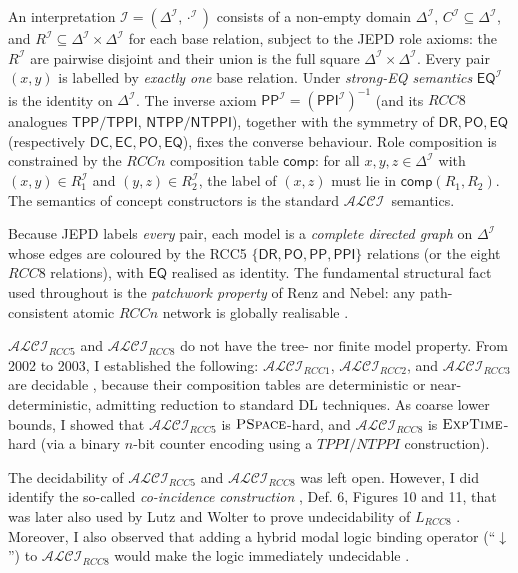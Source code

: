 \documentclass[
]{ceurart}
\theoremstyle{definition}
\newcommand{\ALCI}{\ensuremath{\mathcal{ALCI}}}
\newcommand{\ALCIRCC}[1]{\ensuremath{\mathcal{ALCI}_{\mathit{RCC#1}}}}
\newcommand{\LRCC}[1]{\ensuremath{L_{\mathit{RCC#1}}}}
\newcommand{\DR}{\ensuremath{\mathsf{DR}}}
\newcommand{\PO}{\ensuremath{\mathsf{PO}}}
\newcommand{\EQ}{\ensuremath{\mathsf{EQ}}}
\newcommand{\PP}{\ensuremath{\mathsf{PP}}}
\newcommand{\PPI}{\ensuremath{\mathsf{PPI}}}
\newcommand{\TPP}{\ensuremath{\mathsf{TPP}}}
\newcommand{\NTPP}{\ensuremath{\mathsf{NTPP}}}
\newcommand{\TPPI}{\ensuremath{\mathsf{TPPI}}}
\newcommand{\NTPPI}{\ensuremath{\mathsf{NTPPI}}}
\newcommand{\DC}{\ensuremath{\mathsf{DC}}}
\newcommand{\EC}{\ensuremath{\mathsf{EC}}}
\newcommand{\comp}{\ensuremath{\mathsf{comp}}}
\newcommand{\EXPTIME}{\textsc{ExpTime}}
\newcommand{\PSPACE}{\textsc{PSpace}}
\newcommand{\RCCfive}{\{\DR,\PO,\PP,\PPI\}}
\begin{document}
An interpretation $\mathcal{I} = (\Delta^{\mathcal{I}},
\cdot^{\mathcal{I}})$ consists of a non-empty domain
$\Delta^{\mathcal{I}}$, $C^{\mathcal{I}} \subseteq
\Delta^{\mathcal{I}}$, and $R^{\mathcal{I}} \subseteq
\Delta^{\mathcal{I}} \times \Delta^{\mathcal{I}}$ for each base
relation, subject to the JEPD role axioms: the $R^{\mathcal{I}}$ are
pairwise disjoint and their union is the full square
$\Delta^{\mathcal{I}} \times \Delta^{\mathcal{I}}$. Every pair $(x,y)$
is labelled by \emph{exactly one} base relation. Under \emph{strong-EQ
semantics} \cite{Wessel2003} $\EQ^{\mathcal{I}}$ is the identity on
$\Delta^{\mathcal{I}}$. The inverse axiom $\PP^{\mathcal{I}} =
(\PPI^{\mathcal{I}})^{-1}$ (and its $\mathit{RCC}8$ analogues
$\TPP/\TPPI$, $\NTPP/\NTPPI$), together with the symmetry of
$\DR,\PO,\EQ$ (respectively $\DC,\EC,\PO,\EQ$), fixes the converse
behaviour. Role composition is constrained by the $\mathit{RCC}n$
composition table $\comp$: for all $x,y,z \in \Delta^{\mathcal{I}}$
with $(x,y) \in R_1^{\mathcal{I}}$ and $(y,z) \in R_2^{\mathcal{I}}$,
the label of $(x,z)$ must lie in $\comp(R_1, R_2)$. The semantics of
concept constructors is the standard \ALCI\ semantics. 

Because JEPD labels \emph{every} pair, each model is a \emph{complete
directed graph} on $\Delta^{\mathcal{I}}$ whose edges are coloured by
the RCC5 $\RCCfive$ relations (or the eight $\mathit{RCC}8$
relations), with $\EQ$ realised as identity. The fundamental
structural fact used throughout is the \emph{patchwork property} of
Renz and Nebel: any path-consistent atomic $\mathit{RCC}n$ network is
globally realisable \cite{RenzNebel1999}. 

$\ALCIRCC{5}$ and $\ALCIRCC{8}$ do not have the tree- nor finite model
property. From 2002 to 2003, I established the following:
$\ALCIRCC{1}$, $\ALCIRCC{2}$, and $\ALCIRCC{3}$ are decidable
\cite{Wessel2002, Wessel2003}, because their composition tables are
deterministic or near-deterministic, admitting reduction to standard
DL techniques. As coarse lower bounds, I showed that $\ALCIRCC{5}$ is
$\PSPACE$-hard, and $\ALCIRCC{8}$ is $\EXPTIME$-hard (via a binary
$n$-bit counter encoding using a $\mathit{TPPI}/\mathit{NTPPI}$
construction).

The decidability of $\ALCIRCC{5}$ and $\ALCIRCC{8}$ was left
open. However, I did identify the so-called \emph{co-incidence
construction} \cite{Wessel2003}, Def. 6, Figures 10 and 11, that was
later also used by Lutz and Wolter to prove undecidability of
$\LRCC{8}$ \cite{LutzWolter2006}. Moreover, I also observed that
adding a hybrid modal logic binding operator (``$\downarrow$'') to
$\ALCIRCC{8}$ would make the logic immediately undecidable
\cite{Wessel2003}.
\end{document}
